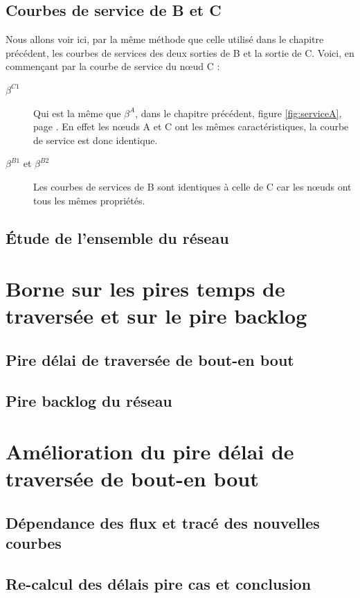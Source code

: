 \subsection{Courbes de service de B et C}
Nous allons voir ici, par la même méthode que celle utilisé dans le chapitre précédent, les courbes de services des deux sorties de B et la sortie de C. Voici, en commençant par la courbe de service du n\oe ud C :
\begin{description}
\item[$\beta^{C1}$] Qui est la même que $\beta^A$, dans le chapitre précédent, figure \ref{fig:serviceA}, page \pageref{fig:serviceA}. En effet les n\oe uds A et C ont les mêmes caractéristiques, la courbe de service est donc identique.
\item[$\beta^{B1}$ et $\beta^{B2}$] Les courbes de services de B sont identiques à celle de C car les n\oe uds ont tous les mêmes propriétés. 
\end{description}

\subsection{Étude de l'ensemble du réseau}


\section{Borne sur les pires temps de traversée et sur le pire backlog}

\subsection{Pire délai de traversée de bout-en bout}

\subsection{Pire backlog du réseau}

\section{Amélioration du pire délai de traversée de bout-en bout}
\subsection{Dépendance des flux et tracé des nouvelles courbes}
\subsection{Re-calcul des délais pire cas et conclusion}